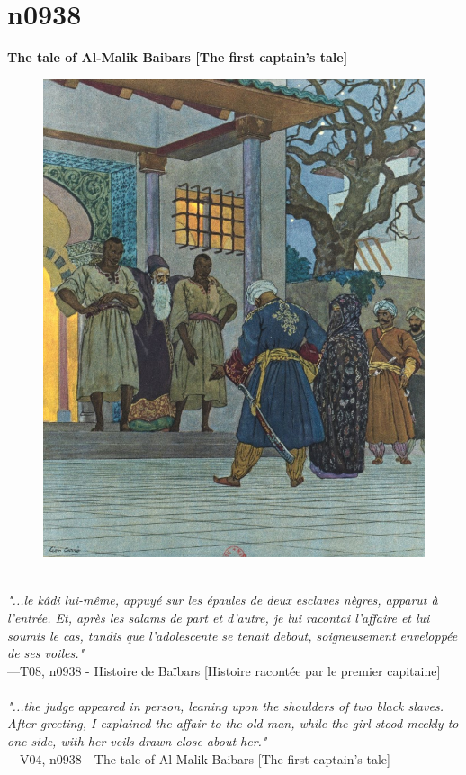 \documentclass[../Carre_nights.tex]{subfiles}
\begin{document}
\newpage

\section{n0938}
\textbf{\Large{The tale of Al-Malik Baibars [The first captain’s tale]}} \\

\begin{figure}[ht]
\centering
\includegraphics[height=\figsize]{illustrations/volume_8/T08, n0938 - Histoire de Baïbars [Histoire racontée par le premier capitaine].jpg}
\end{figure}

\textit{\\
"...le kâdi lui-même, appuyé sur les épaules de deux esclaves nègres, apparut à l’entrée. Et, après les salams de part et d’autre, je lui racontai l’affaire et lui soumis le cas, tandis que l’adolescente se tenait debout, soigneusement enveloppée de ses voiles."} \\
—T08, n0938 - Histoire de Baïbars [Histoire racontée par le premier capitaine] \\~\\
\textit{"...the judge appeared in person, leaning upon the shoulders of two black slaves. After greeting, I explained the affair to the old man, while the girl stood meekly to one side, with her veils drawn close about her."} \\
—V04, n0938 - The tale of Al-Malik Baibars [The first captain’s tale]
\end{document}
